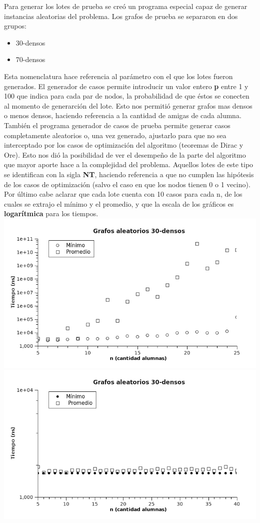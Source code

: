 Para generar los lotes de prueba se creó un programa especial capaz de generar instancias aleatorias del problema. Los grafos de prueba se separaron en dos grupos:
\begin{itemize}
 \item 30-densos
 \item 70-densos
\end{itemize}
Esta nomenclatura hace referencia al parámetro  con el que los lotes fueron generados. El generador de casos permite introducir un valor entero \textbf{p} entre 1 y 100 que indica para cada par de nodos, la probabilidad de que éstos se conecten al momento de generarción del lote. Esto nos permitió generar grafos mas densos o menos densos, haciendo referencia a la cantidad de amigas de cada alumna. 
También el programa generador de casos de prueba permite generar casos completamente aleatorios o, una vez generado, ajustarlo para que no sea interceptado por los casos de optimización del algoritmo (teoremas de Dirac y Ore). Esto nos dió la posibilidad de ver el desempeño de la parte del 
algoritmo que mayor aporte hace a la complejidad del problema. Aquellos lotes de este tipo se identifican con la sigla \textbf{NT}, haciendo referencia a que no cumplen las hipótesis de los 
casos de optimización (salvo el caso en que los nodos tienen 0 o 1 vecino).
Por último cabe aclarar que cada lote cuenta con 10 casos para cada n, de los cuales se extrajo el mínimo y el promedio, y que la escala de los gráficos es \textbf{logarítmica} para los tiempos.
\newline
\includegraphics[scale=0.8]{img/ej2/tests/30d_lote1.png}
\newline
\includegraphics[scale=0.8]{img/ej2/tests/30d_lote2.png}

